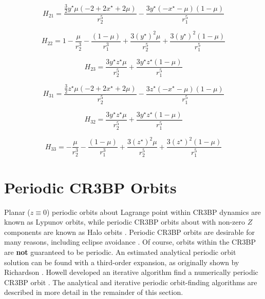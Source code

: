 \documentclass[conf]{new-aiaa}
\begin{document}
\begin{multicols*}{2}
    
\begin{equation}
    H_{21} =\frac{\frac{3}{2} y^{\star} \mu \left( -2 + 2 x^{\star} + 2 \mu \right)}{r_2^{5}} - \frac{3 y^{\star} \left(  - x^{\star} - \mu \right) \left( 1 - \mu \right)}{r_1^{5}}
\end{equation}
    
    
\begin{equation}
    H_{22} =1 - \frac{\mu}{r_2^{3}} - \frac{\left( 1 - \mu \right)}{r_1^{3}} + \frac{3 \left(y^{\star}\right)^{2} \mu}{r_2^{5}} + \frac{3 \left(y^{\star}\right)^{2} \left( 1 - \mu \right)}{r_1^{5}}
\end{equation}
    
    
\begin{equation}
    H_{23} = \frac{3 y^{\star} z^{\star} \mu}{r_2^{5}} + \frac{3 y^{\star} z^{\star} \left( 1 - \mu \right)}{r_1^{5}}
\end{equation}
    
    
\begin{equation}
    H_{31} =\frac{\frac{3}{2} z^{\star} \mu \left( -2 + 2 x^{\star} + 2 \mu \right)}{r_2^{5}} - \frac{3 z^{\star} \left(  - x^{\star} - \mu \right) \left( 1 - \mu \right)}{r_1^{5}}
\end{equation}
    
    
\begin{equation}
    H_{32} =\frac{3 y^{\star} z^{\star} \mu}{r_2^{5}} + \frac{3 y^{\star} z^{\star} \left( 1 - \mu \right)}{r_1^{5}}
\end{equation}
    
    
\begin{equation}
    H_{33} = - \frac{\mu}{r_2^{3}} - \frac{\left( 1 - \mu \right)}{r_1^{3}} + \frac{3 \left(z^{\star}\right)^{2} \mu}{r_2^{5}} + \frac{3 \left(z^{\star}\right)^{2} \left( 1 - \mu \right)}{r_1^{5}}
\end{equation}

\section{Periodic CR3BP Orbits}

Planar ($z \equiv 0$) periodic orbits about Lagrange point within 
CR3BP dynamics are known as Lypunov orbits, while periodic CR3BP orbits
about with non-zero $Z$ components are known as Halo orbits 
\cite{koon2008dynamical}.
Periodic CR3BP orbits are desirable for many reasons, including
eclipse avoidance 
\cite{williams2017targeting}.
Of course, orbits within the CR3BP are \textbf{not} guaranteed to be
periodic. An estimated analytical periodic orbit solution can be found 
with a third-order expansion, as originally shown by Richardson
\cite{richardson1980analytical}
\cite{koon2008dynamical}
\cite{rund2018interplanetary}. 
Howell developed an iterative algorithm find a numerically 
periodic CR3BP orbit
\cite{howell1984three} 
\cite{koon2008dynamical} 
\cite{rund2018interplanetary}.
The analytical and iterative periodic orbit-finding algorithms 
are described in more detail in the remainder of this section.


\end{multicols*}
\end{document}
